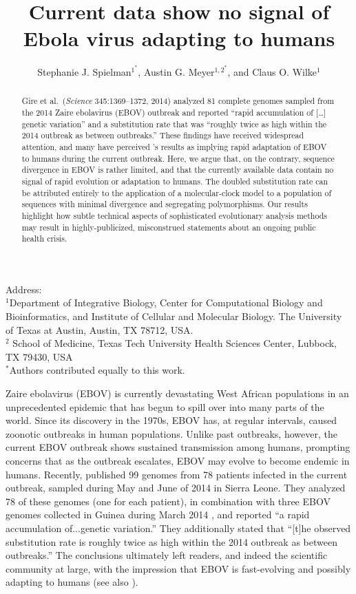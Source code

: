\documentclass[11pt]{article}
\title{Current data show no signal of Ebola virus adapting to humans}
\author{Stephanie J. Spielman$^{1^\ast}$, Austin G. Meyer$^{1,2^\ast}$, and Claus O. Wilke$^{1}$}
\begin{document}
\maketitle
\maketitle
\noindent
Address:\\
$^1$Department of Integrative Biology, Center for Computational Biology and Bioinformatics, and Institute of Cellular and Molecular Biology.
The University of Texas at Austin, Austin, TX 78712, USA.\\
$^2$ School of Medicine, Texas Tech University Health Sciences Center, Lubbock, TX 79430, USA \\
$^\ast$Authors contributed equally to this work.


\begin{abstract}
Gire et al.\ (\emph{Science} 345:1369--1372, 2014) analyzed 81 complete genomes sampled from the 2014 Zaire ebolavirus (EBOV) outbreak and reported ``rapid accumulation of [\dots] genetic variation'' and a substitution rate that was ``roughly twice as high within the 2014 outbreak as between outbreaks.'' These findings have received widespread attention, and many have perceived \citet{Gire2014}'s results as implying rapid adaptation of EBOV to humans during the current outbreak. Here, we argue that, on the contrary, sequence divergence in EBOV is rather limited, and that the currently available data contain no signal of rapid evolution or adaptation to humans. The doubled substitution rate can be attributed entirely to the application of a molecular-clock model to a population of sequences with minimal divergence and segregating polymorphisms. Our results highlight how subtle technical aspects of sophisticated evolutionary analysis methods may result in highly-publicized, misconstrued statements about an ongoing public health crisis.
\end{abstract}

\noindent
Zaire ebolavirus (EBOV) is currently devastating West African populations in an unprecedented epidemic that has begun to spill over into many parts of the world. Since its discovery in the 1970s, EBOV has, at regular intervals, caused zoonotic outbreaks in human populations. Unlike past outbreaks, however, the current EBOV outbreak shows sustained transmission among humans, prompting concerns that as the outbreak escalates, EBOV may evolve to become endemic in humans. Recently, \citet{Gire2014} published 99 genomes from 78 patients infected in the current outbreak, sampled during May and June of 2014 in Sierra Leone. They analyzed 78 of these genomes (one for each patient), in combination with three EBOV genomes collected in Guinea during March 2014 \citep{Baizeetal2014}, and reported ``a rapid accumulation of...genetic variation.'' They additionally stated that ``[t]he observed substitution rate is roughly twice as high within the 2014 outbreak as between outbreaks.'' The conclusions ultimately left readers, and indeed the scientific community at large, with the impression that EBOV is fast-evolving and possibly adapting to humans (see also \citealt{NatureEditorial,Lukszaetal2014,Alexanderetal2014}). 
\end{document}
